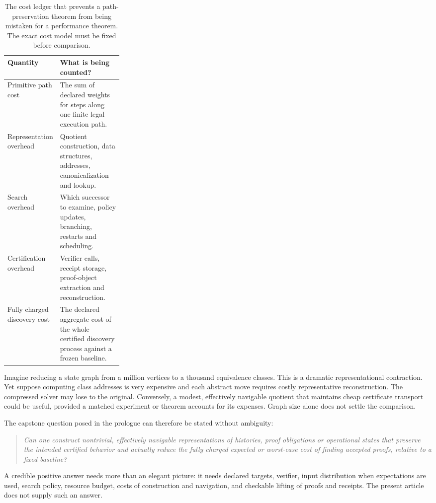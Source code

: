 \documentclass[11pt,letterpaper]{article}
\theoremstyle{plaincompact}
\begin{document}
\begin{table}[htbp]
\centering\small
\begin{tabularx}{\linewidth}{@{}p{0.27\linewidth}X@{}}
\toprule
\textbf{Quantity} & \textbf{What is being counted?}\\
\midrule
Primitive path cost & The sum of declared weights for steps along one finite legal execution path.\\
Representation overhead & Quotient construction, data structures, addresses, canonicalization and lookup.\\
Search overhead & Which successor to examine, policy updates, branching, restarts and scheduling.\\
Certification overhead & Verifier calls, receipt storage, proof-object extraction and reconstruction.\\
Fully charged discovery cost & The declared aggregate cost of the whole certified discovery process against a frozen baseline.\\
\bottomrule
\end{tabularx}
\caption{The cost ledger that prevents a path-preservation theorem from being mistaken for a performance theorem. The exact cost model must be fixed before comparison.}
\end{table}

Imagine reducing a state graph from a million vertices to a thousand equivalence classes. This is a dramatic representational contraction. Yet suppose computing class addresses is very expensive and each abstract move requires costly representative reconstruction. The compressed solver may lose to the original. Conversely, a modest, effectively navigable quotient that maintains cheap certificate transport could be useful, provided a matched experiment or theorem accounts for its expenses. Graph size alone does not settle the comparison.

The capstone question posed in the prologue can therefore be stated without ambiguity:

\begin{quote}
\emph{Can one construct nontrivial, effectively navigable representations of histories, proof obligations or operational states that preserve the intended certified behavior and actually reduce the fully charged expected or worst-case cost of finding accepted proofs, relative to a fixed baseline?}
\end{quote}

A credible positive answer needs more than an elegant picture: it needs declared targets, verifier, input distribution when expectations are used, search policy, resource budget, costs of construction and navigation, and checkable lifting of proofs and receipts. The present article does not supply such an answer.
\end{document}
